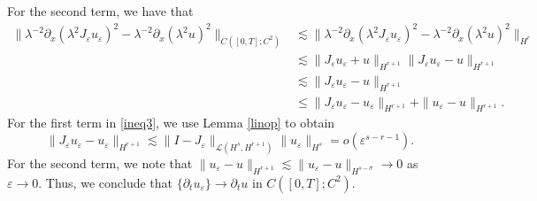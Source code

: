 \documentclass[reqno]{amsart}
\theoremstyle{plain}
\numberwithin{equation}{section}
\newcommand{\p}{\partial}
\newcommand{\ee}{\varepsilon}
\newcommand{\s}{\sigma}
\begin{document}
For the second term, we have that
\begin{align}\label{ineq3}
    \|\lambda^{-2}\p_x(\lambda^2 J_\ee u_\ee)^2-\lambda^{-2}\p_x(\lambda ^2u)^2\|_{C([0,T];C^2)} &\lesssim \|\lambda^{-2}\p_x(\lambda ^2J_\ee u_\ee)^2-\lambda^{-2}\p_x(\lambda^2 u)^2\|_{H^r} \nonumber \\
    & \lesssim \|J_\ee u_\ee + u\|_{H^{r+1}}\|J_\ee u_\ee - u\|_{H^{r+1}} \nonumber \\ 
    &\lesssim \|J_\ee u_\ee - u\|_{H^{r+1}} \nonumber \\ 
    &\leq \|J_\ee u_\ee-u_\ee\|_{H^{r+1}}+\|u_\ee-u\|_{H^{r+1}}.
\end{align}
For the first term in \eqref{ineq3}, we use Lemma \ref{linop} to obtain
\begin{equation}\label{ineq4}
    \|J_\ee u_\ee-u_\ee\|_{H^{r+1}} \lesssim \|I-J_\ee\|_{\mathcal{L}(H^s,H^{r+1})}\|u_\ee\|_{H^s} = o\left(\ee^{s-r-1}\right).
\end{equation}
For the second term, we note that
$
\|u_\ee-u\|_{H^{r+1}} \lesssim \|u_\ee-u\|_{H^{s-\s}} \to 0
$
as $\ee \to 0$.  Thus, we conclude that $\{\p_tu_\ee\} \to \p_t u$ in $C([0,T];C^2)$.
\end{document}
